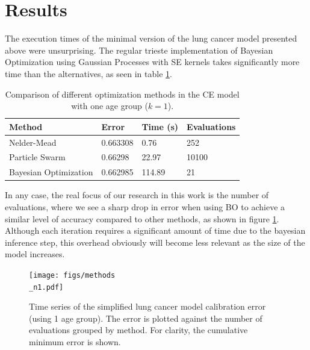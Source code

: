 \documentclass{IOS-Book-Article}
\begin{document}
	\section{Results}
	The execution times of the minimal version of the lung cancer model presented above were unsurprising. The regular trieste implementation of Bayesian Optimization using Gaussian Processes with SE kernels takes significantly more time than the alternatives, as seen in table \ref{tab:result-methods}.
	
	
	\begin{table}[h!]
		\centering
		\begin{tabular}{llll} 
			\hline
			Method & Error & Time (s) & Evaluations \\ 
			\hline
			Nelder-Mead & 0.663308 & 0.76 & 252 \\ 
			Particle Swarm & 0.66298 & 22.97 & 10100 \\
			Bayesian Optimization & 0.662985 & 114.89 & 21 \\
			\hline
		\end{tabular}
		\caption{Comparison of different optimization methods in the CE model with one age group ($k=1$).}
		\label{tab:result-methods}
	\end{table}
	
	In any case, the real focus of our research in this work is the number of evaluations, where we see a sharp drop in error when using BO to achieve a similar level of accuracy compared to other methods, as shown in figure \ref{fig:method_comparison}. Although each iteration requires a significant amount of time due to the bayesian inference step, this overhead obviously will become less relevant as the size of the model increases.
	
	\begin{figure}[h!]
		\centering	
		\texttt{[image: figs/methods\\\_n1.pdf]}		
		\caption{Time series of the simplified lung cancer model calibration error (using 1 age group). The error is plotted against the number of evaluations grouped by method. For clarity, the cumulative minimum error is shown.}
		\label{fig:method_comparison}	
	\end{figure}
	
\end{document}
